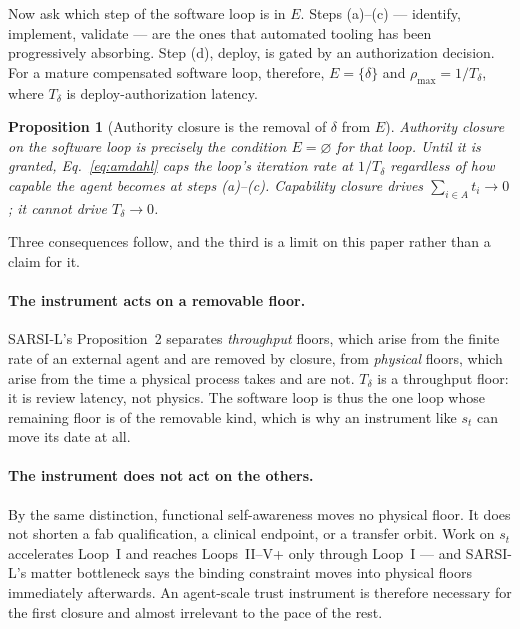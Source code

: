 \documentclass[11pt]{article}
\newtheorem{proposition}{Proposition}
\begin{document}
Now ask which step of the software loop is in $E$. Steps (a)--(c) --- identify, implement, validate --- are the ones that automated tooling has been progressively absorbing. Step (d), deploy, is gated by an authorization decision. For a mature compensated software loop, therefore, $E=\{\delta\}$ and $\rho_{\max}=1/T_\delta$, where $T_\delta$ is deploy-authorization latency.

\begin{proposition}[Authority closure is the removal of $\delta$ from $E$]
\label{prop:authority}
Authority closure on the software loop is precisely the condition $E=\varnothing$ for that loop. Until it is granted, Eq.~\eqref{eq:amdahl} caps the loop's iteration rate at $1/T_\delta$ regardless of how capable the agent becomes at steps (a)--(c). Capability closure drives $\sum_{i\in A}t_i \to 0$; it cannot drive $T_\delta \to 0$.
\end{proposition}

Three consequences follow, and the third is a limit on this paper rather than a claim for it.

\paragraph{The instrument acts on a removable floor.} SARSI-L's Proposition~2 separates \emph{throughput} floors, which arise from the finite rate of an external agent and are removed by closure, from \emph{physical} floors, which arise from the time a physical process takes and are not. $T_\delta$ is a throughput floor: it is review latency, not physics. The software loop is thus the one loop whose remaining floor is of the removable kind, which is why an instrument like $s_t$ can move its date at all.

\paragraph{The instrument does not act on the others.} By the same distinction, functional self-awareness moves no physical floor. It does not shorten a fab qualification, a clinical endpoint, or a transfer orbit. Work on $s_t$ accelerates Loop~I and reaches Loops~II--V+ only through Loop~I --- and SARSI-L's matter bottleneck says the binding constraint moves into physical floors immediately afterwards. An agent-scale trust instrument is therefore necessary for the first closure and almost irrelevant to the pace of the rest.
\end{document}
